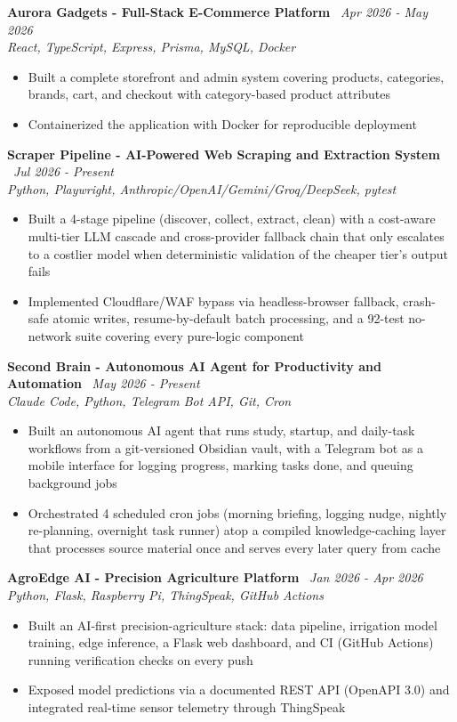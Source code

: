 \documentclass[10.5pt,a4paper]{article}
\newenvironment{tightitemize}{
  \begin{itemize}[leftmargin=15pt, itemsep=1pt, parsep=0pt, topsep=2pt]
}{
  \end{itemize}
}
\newcommand{\entrysimple}[2]{%
  \textbf{#1} \textbar\ \textit{#2}\\[1pt]
}
\begin{document}
\entrysimple{Aurora Gadgets - Full-Stack E-Commerce Platform}{Apr 2026 - May 2026}
\textit{React, TypeScript, Express, Prisma, MySQL, Docker}
\begin{tightitemize}
  \item Built a complete storefront and admin system covering products, categories, brands, cart, and checkout with category-based product attributes
  \item Containerized the application with Docker for reproducible deployment
\end{tightitemize}

\entrysimple{Scraper Pipeline - AI-Powered Web Scraping and Extraction System}{Jul 2026 - Present}
\textit{Python, Playwright, Anthropic/OpenAI/Gemini/Groq/DeepSeek, pytest}
\begin{tightitemize}
  \item Built a 4-stage pipeline (discover, collect, extract, clean) with a cost-aware multi-tier LLM cascade and cross-provider fallback chain that only escalates to a costlier model when deterministic validation of the cheaper tier's output fails
  \item Implemented Cloudflare/WAF bypass via headless-browser fallback, crash-safe atomic writes, resume-by-default batch processing, and a 92-test no-network suite covering every pure-logic component
\end{tightitemize}

\entrysimple{Second Brain - Autonomous AI Agent for Productivity and Automation}{May 2026 - Present}
\textit{Claude Code, Python, Telegram Bot API, Git, Cron}
\begin{tightitemize}
  \item Built an autonomous AI agent that runs study, startup, and daily-task workflows from a git-versioned Obsidian vault, with a Telegram bot as a mobile interface for logging progress, marking tasks done, and queuing background jobs
  \item Orchestrated 4 scheduled cron jobs (morning briefing, logging nudge, nightly re-planning, overnight task runner) atop a compiled knowledge-caching layer that processes source material once and serves every later query from cache
\end{tightitemize}

\entrysimple{AgroEdge AI - Precision Agriculture Platform}{Jan 2026 - Apr 2026}
\textit{Python, Flask, Raspberry Pi, ThingSpeak, GitHub Actions}
\begin{tightitemize}
  \item Built an AI-first precision-agriculture stack: data pipeline, irrigation model training, edge inference, a Flask web dashboard, and CI (GitHub Actions) running verification checks on every push
  \item Exposed model predictions via a documented REST API (OpenAPI 3.0) and integrated real-time sensor telemetry through ThingSpeak
\end{tightitemize}
\end{document}
